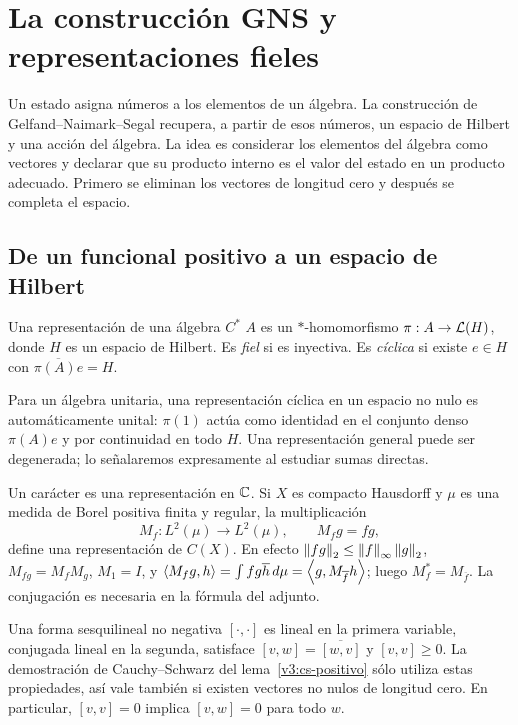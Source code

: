 \chapter{La construcción GNS y representaciones fieles}\label{cap:v3-15}

Un estado asigna números a los elementos de un álgebra. La construcción de Gelfand--Naimark--Segal recupera, a partir de esos números, un espacio de Hilbert y una acción del álgebra. La idea es considerar los elementos del álgebra como vectores y declarar que su producto interno es el valor del estado en un producto adecuado. Primero se eliminan los vectores de longitud cero y después se completa el espacio.

\section{De un funcional positivo a un espacio de Hilbert}\label{lec:v3-29}

\begin{definicion}
Una representación de una álgebra $C^*$ $A$ es un $*$-homomorfismo $\pi:A\to\mathcal L(H)$, donde $H$ es un espacio de Hilbert. Es \emph{fiel} si es inyectiva. Es \emph{cíclica} si existe $e\in H$ con $\overline{\pi(A)e}=H$.
\end{definicion}

Para un álgebra unitaria, una representación cíclica en un espacio no nulo es automáticamente unital: $\pi(1)$ actúa como identidad en el conjunto denso $\pi(A)e$ y por continuidad en todo $H$. Una representación general puede ser degenerada; lo señalaremos expresamente al estudiar sumas directas.

\begin{ejemplo}
Un carácter es una representación en $\mathbb C$. Si $X$ es compacto Hausdorff y $\mu$ es una medida de Borel positiva finita y regular, la multiplicación
\[
 M_f:L^2(\mu)\to L^2(\mu),\qquad M_fg=fg,
\]
define una representación de $C(X)$. En efecto $\left\lVert fg\right\rVert_2\le\left\lVert f\right\rVert_\infty\left\lVert g\right\rVert_2$, $M_{fg}=M_fM_g$, $M_1=I$, y
$\left\langle M_fg,h\right\rangle=\int fg\overline h\,d\mu=\left\langle g,M_{\overline f}h\right\rangle$; luego $M_f^*=M_{\overline f}$. La conjugación es necesaria en la fórmula del adjunto.
\end{ejemplo}

Una forma sesquilineal no negativa $[\cdot,\cdot]$ es lineal en la primera variable, conjugada lineal en la segunda, satisface $[v,w]=\overline{[w,v]}$ y $[v,v]\ge0$. La demostración de Cauchy--Schwarz del lema~\ref{v3:cs-positivo} sólo utiliza estas propiedades, así vale también si existen vectores no nulos de longitud cero. En particular, $[v,v]=0$ implica $[v,w]=0$ para todo $w$.

